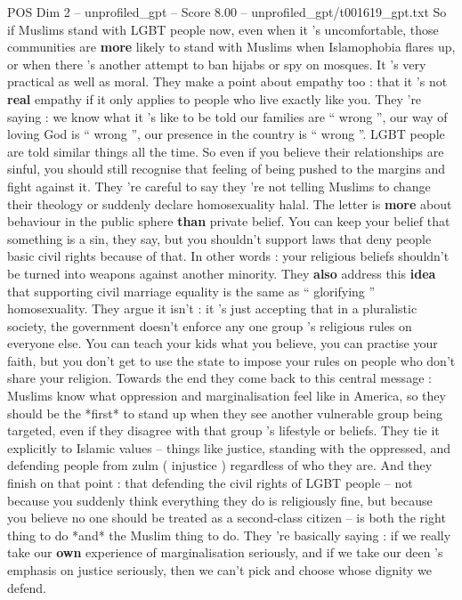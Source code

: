 \begin{textsample}{POS Dim 2 – unprofiled\_gpt – Score 8.00 – unprofiled\_gpt/t001619\_gpt.txt}
So if Muslims stand with LGBT people now, even when it ’s uncomfortable, those communities are \textbf{more} likely to stand with Muslims when Islamophobia flares up, or when there ’s another attempt to ban hijabs or spy on mosques.
It ’s very practical as well as moral.
They make a point about empathy too : that it ’s not \textbf{real} empathy if it only applies to people who live exactly like you.
They ’re saying : we know what it ’s like to be told our families are “ wrong ”, our way of loving God is “ wrong ”, our presence in the country is “ wrong ”.
LGBT people are told similar things all the time.
So even if you believe their relationships are sinful, you should still recognise that feeling of being pushed to the margins and fight against it.
They ’re careful to say they ’re not telling Muslims to change their theology or suddenly declare homosexuality halal.
The letter is \textbf{more} about behaviour in the public sphere \textbf{than} private belief.
You can keep your belief that something is a sin, they say, but you shouldn't support laws that deny people basic civil rights because of that.
In other words : your religious beliefs shouldn't be turned into weapons against another minority.
They \textbf{also} address this \textbf{idea} that supporting civil marriage equality is the same as “ glorifying ” homosexuality.
They argue it isn't : it ’s just accepting that in a pluralistic society, the government doesn't enforce any one group ’s religious rules on everyone else.
You can teach your kids what you believe, you can practise your faith, but you don't get to use the state to impose your rules on people who don't share your religion.
Towards the end they come back to this central message : Muslims know what oppression and marginalisation feel like in America, so they should be the *first* to stand up when they see another vulnerable group being targeted, even if they disagree with that group ’s lifestyle or beliefs.
They tie it explicitly to Islamic values – things like justice, standing with the oppressed, and defending people from zulm ( injustice ) regardless of who they are.
And they finish on that point : that defending the civil rights of LGBT people – not because you suddenly think everything they do is religiously fine, but because you believe no one should be treated as a second‑class citizen – is both the right thing to do *and* the Muslim thing to do.
They ’re basically saying : if we really take our \textbf{own} experience of marginalisation seriously, and if we take our deen ’s emphasis on justice seriously, then we can't pick and choose whose dignity we defend.

\end{textsample}
